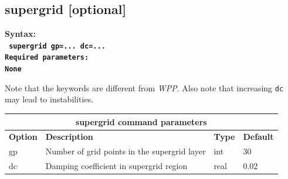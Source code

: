 \documentclass[11pt]{report}
\begin{document}
\subsection{supergrid [optional]} \label{sec:supergrid}
\label{keyword:supergrid}
\begin{flushleft}\bf
Syntax:\\
\tt
supergrid gp=... dc=...
\\
\bf Required parameters:\\
\rm
None
\end{flushleft}
Note that the keywords are different from \emph{WPP}. Also note that
increasing {\tt dc} may lead to instabilities.
\begin{center}
\begin{tabular}{|l|p{10cm}|l|l|} \hline
\multicolumn{4}{|c|}{\bf supergrid command parameters}\\ \hline
\bf{Option} & \bf{Description} & \bf{Type} & \bf{Default} \\ \hline \hline
%
gp &  Number of grid points in the supergrid layer & int & 30\\ \hline
%
dc & Damping coefficient in supergrid region & real & 0.02 \\ \hline
\end{tabular}
\end{center}

\end{document}
